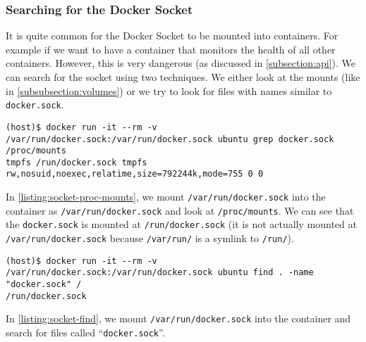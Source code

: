 \subsubsection{Searching for the Docker Socket}
It is quite common for the Docker Socket to be mounted into containers. For example if we want to have a container that monitors the health of all other containers. However, this is very dangerous (as discussed in \autoref{subsection:api}). We can search for the socket using two techniques. We either look at the mounts (like in \autoref{subsubsection:volumes}) or we try to look for files with names similar to \lstinline{docker.sock}.

\begin{lstlisting}[caption={\lstinline{docker.sock} in \lstinline{/proc/mounts}.},captionpos=b,label={listing:socket-proc-mounts}]
(host)$ docker run -it --rm -v /var/run/docker.sock:/var/run/docker.sock ubuntu grep docker.sock /proc/mounts
tmpfs /run/docker.sock tmpfs rw,nosuid,noexec,relatime,size=792244k,mode=755 0 0
\end{lstlisting}

In \autoref{listing:socket-proc-mounts}, we mount \lstinline{/var/run/docker.sock} into the container as \lstinline{/var/run/docker.sock} and look at \lstinline{/proc/mounts}. We can see that the \lstinline{docker.sock} is mounted at \lstinline{/run/docker.sock} (it is not actually mounted at \lstinline{/var/run/docker.sock} because \lstinline{/var/run/} is a symlink to \lstinline{/run/}).

\medskip

\begin{lstlisting}[caption={Running \lstinline{find} to search for \lstinline{docker.sock}.},captionpos=b, label={listing:socket-find}]
(host)$ docker run -it --rm -v /var/run/docker.sock:/var/run/docker.sock ubuntu find . -name "docker.sock" /
/run/docker.sock
\end{lstlisting}

In \autoref{listing:socket-find}, we mount \lstinline{/var/run/docker.sock} into the container and search for files called ``\lstinline{docker.sock}''.
